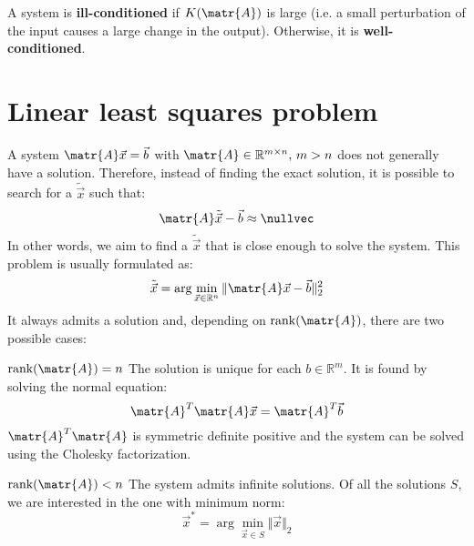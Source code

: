 A system is \textbf{ill-conditioned} if $K(\matr{A})$ is large 
(i.e. a small perturbation of the input causes a large change in the output).
Otherwise, it is \textbf{well-conditioned}. 


\section{Linear least squares problem}

A system $\matr{A}\vec{x} = \vec{b}$ with $\matr{A} \in \mathbb{R}^{m \times n} \text{, } m > n$ 
does not generally have a solution.
Therefore, instead of finding the exact solution, it is possible to search for a $\tilde{\vec{x}}$ such that:
\[ \matr{A}\tilde{\vec{x}} - \vec{b} \approx \nullvec \]
In other words, we aim to find a $\tilde{\vec{x}}$ that is close enough to solve the system.
This problem is usually formulated as:
\[ 
    \tilde{\vec{x}} = \arg\min_{\vec{x} \in \mathbb{R}^n} \Vert \matr{A}\vec{x} - \vec{b} \Vert_2^2
\]
It always admits a solution and, depending on $\text{rank}(\matr{A})$, there are two possible cases:
\begin{descriptionlist}
    \item[$\text{rank}(\matr{A}) = n$] 
        The solution is unique for each $b \in \mathbb{R}^m$.
        It is found by solving the normal equation:
        \[ \matr{A}^T\matr{A}\vec{x} = \matr{A}^T\vec{b} \]
        $\matr{A}^T\matr{A}$ is symmetric definite positive and the system can be solved using the Cholesky factorization.
    
    \item[$\text{rank}(\matr{A}) < n$]
        The system admits infinite solutions.
        Of all the solutions $S$, we are interested in the one with minimum norm:
        \[ \vec{x}^* = \arg\min_{\vec{x} \in S} \Vert \vec{x} \Vert_2 \]
\end{descriptionlist}